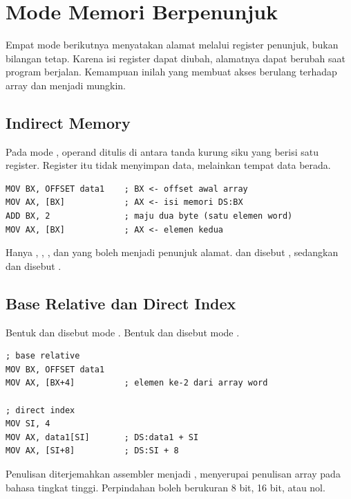 \section{Mode Memori Berpenunjuk}
\label{sec:mode-berpenunjuk}

Empat mode berikutnya menyatakan alamat melalui register penunjuk,
bukan bilangan tetap. Karena isi register dapat diubah, alamatnya
dapat berubah saat program berjalan. Kemampuan inilah yang membuat
akses berulang terhadap array dan  menjadi mungkin.

\subsection{Indirect Memory}

Pada mode , operand ditulis di antara tanda
kurung siku yang berisi satu register. Register itu tidak menyimpan
data, melainkan  tempat data berada.

\begin{lstlisting}[language=MASM, numbers=none]
MOV BX, OFFSET data1    ; BX <- offset awal array
MOV AX, [BX]            ; AX <- isi memori DS:BX
ADD BX, 2               ; maju dua byte (satu elemen word)
MOV AX, [BX]            ; AX <- elemen kedua
\end{lstlisting}

Hanya , , , dan  yang boleh menjadi
penunjuk alamat.  dan  disebut ,
sedangkan  dan  disebut .

\subsection{Base Relative dan Direct Index}

Bentuk \code{[BX+disp]} dan \code{[BP+disp]} disebut mode
. Bentuk \code{[SI+disp]} dan \code{[DI+disp]}
disebut mode .

\begin{lstlisting}[language=MASM, numbers=none]
; base relative
MOV BX, OFFSET data1
MOV AX, [BX+4]          ; elemen ke-2 dari array word

; direct index
MOV SI, 4
MOV AX, data1[SI]       ; DS:data1 + SI
MOV AX, [SI+8]          ; DS:SI + 8
\end{lstlisting}

Penulisan  diterjemahkan assembler menjadi
\code{[data1 + SI]}, menyerupai penulisan array pada bahasa tingkat
tinggi. Perpindahan boleh berukuran 8 bit, 16 bit, atau nol.

